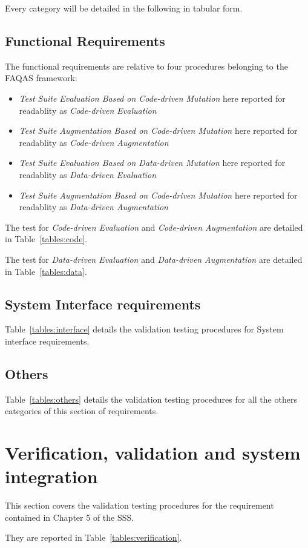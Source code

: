  Every category will be detailed in the following in tabular form.

\subsection{Functional Requirements}

The functional requirements are relative to four procedures belonging to the FAQAS framework:
\begin{itemize}
  \item \emph{Test Suite Evaluation Based on Code-driven Mutation} here reported for readablity as \emph{Code-driven Evaluation}
  \item \emph{Test Suite Augmentation Based on Code-driven Mutation} here reported for readablity as \emph{Code-driven Augmentation}
  \item \emph{Test Suite Evaluation Based on Data-driven Mutation} here reported for readablity as \emph{Data-driven Evaluation}
  \item \emph{Test Suite Augmentation Based on Code-driven Mutation} here reported for readablity as \emph{Data-driven Augmentation}
\end{itemize}

The test for \emph{Code-driven Evaluation} and \emph{Code-driven Augmentation} are detailed in Table~\ref{tables:code}.



The test for \emph{Data-driven Evaluation} and \emph{Data-driven Augmentation} are detailed in Table~\ref{tables:data}.



\subsection{System Interface requirements}

Table~\ref{tables:interface} details the validation testing procedures for System interface requirements.



\subsection{Others}

Table~\ref{tables:others} details the validation testing procedures for all the others categories of this section of  requirements.



\section{Verification, validation and system integration}

This section covers the validation testing procedures for the requirement contained in Chapter 5 of the SSS.

They are reported in Table~\ref{tables:verification}.


